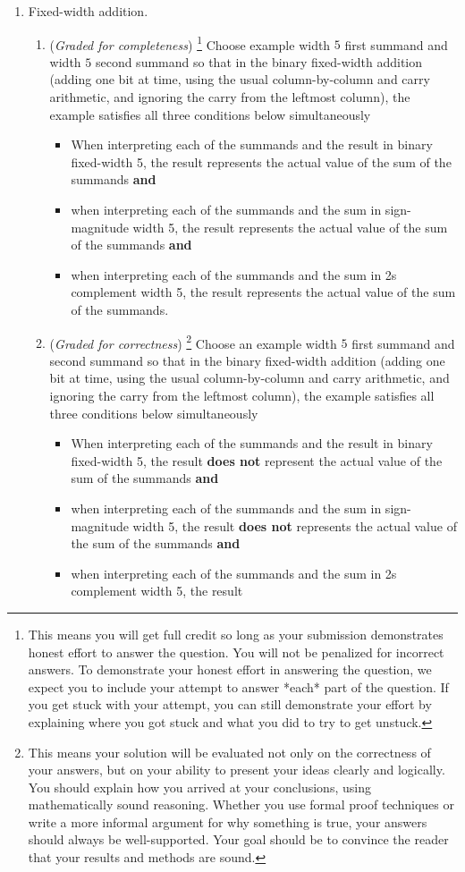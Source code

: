 \documentclass[12pt, oneside]{article}
\newcommand{\gradeCorrect}{({\it Graded for correctness}) }
\newcommand{\gradeCorrectFirst}{\gradeCorrect\footnote{This means your solution 
will be evaluated not only on the correctness of your answers, but on your ability
to present your ideas clearly and logically. You should explain how you 
arrived at your conclusions, using
mathematically sound reasoning. Whether you use formal proof techniques or 
write a more informal argument
for why something is true, your answers should always be well-supported. 
Your goal should be to convince the
reader that your results and methods are sound.} }
\newcommand{\gradeComplete}{({\it Graded for completeness}) }
\newcommand{\gradeCompleteFirst}{\gradeComplete\footnote{This means you will 
get full credit so long as your submission demonstrates honest effort to 
answer the question. You will not be penalized for incorrect answers. 
To demonstrate your honest effort in answering the question, we 
expect you to include your attempt to answer *each* part of the question. 
If you get stuck with your attempt, you can still demonstrate 
your effort by explaining where you got stuck and what 
you did to try to get unstuck.} }
\begin{document}
\begin{enumerate}[labelindent=0pt, leftmargin=0pt]
        \item Fixed-width addition.  
        \begin{enumerate}
            \item\gradeCompleteFirst Choose example width $5$ first summand and width $5$ second summand so that 
            in the  binary fixed-width addition (adding one bit at time, using 
            the usual column-by-column and carry arithmetic, and ignoring the carry 
            from the  leftmost column), the example satisfies all three conditions below simultaneously
            \begin{itemize}
            \item[(1)] When interpreting each of the summands and the result in binary fixed-width 5, 
            the result represents the actual value of the sum of the summands {\bf and}
            \item[(2)] when interpreting each of the summands and the sum in sign-magnitude width 5, the result  
            represents the actual value of the sum of the summands {\bf and}
            \item[(3)] when interpreting each of the summands and the sum in 2s complement width 5, the result 
            represents the actual value of the sum of the summands.
            \end{itemize}
            \item\gradeCorrectFirst Choose an example width $5$ first summand and second summand so that 
            in the binary fixed-width addition (adding one bit at time, using 
            the usual column-by-column and carry arithmetic, and ignoring the carry 
            from the  leftmost column),  the example satisfies all three conditions below simultaneously
            \begin{itemize}
            \item[(1)] When interpreting each of the summands and the result in binary fixed-width 5, 
            the result {\bf does not} represent the actual value of the sum of the summands {\bf and}
            \item[(2)] when interpreting each of the summands and the sum in sign-magnitude width 5, the result  
            {\bf does not} represents the actual value of the sum of the summands {\bf and}
            \item[(3)] when interpreting each of the summands and the sum in 2s complement width 5, the result 

\end{itemize}
\end{enumerate}
\end{enumerate}
\end{document}
